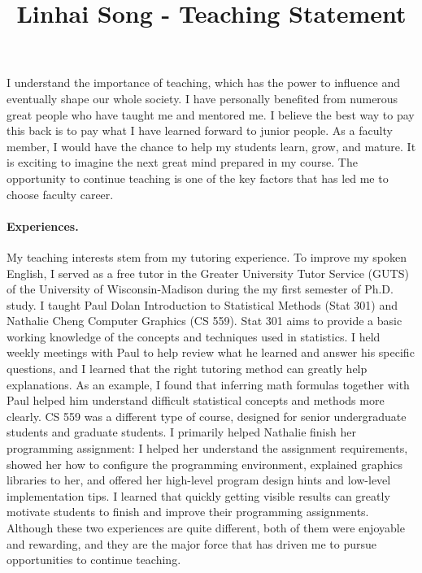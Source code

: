 \documentclass[10pt]{article}
\title{\vspace{-.7in}\bf{Linhai Song - Teaching Statement\vspace{-.4in}}}
\date{}
\begin{document}
\maketitle\vspace{-.2in}

I understand the importance of teaching, which has the power to influence and eventually shape our whole society. 
I have personally benefited from numerous great people who have taught me and mentored me. 
I believe the best way to pay this back is to pay what I have learned forward to junior people. 
As a faculty member, I would have the chance to help my students learn, grow, and mature. 
It is exciting to imagine the next great mind prepared in my course. 
The opportunity to continue teaching is one of the key factors that has led me to choose faculty career.

\vspace{-0.1in}
\paragraph*{Experiences.} 
My teaching interests stem from my tutoring experience. 
To improve my spoken English, I served as a
free tutor in the Greater University Tutor Service (GUTS) of the University of Wisconsin-Madison during the my first semester of Ph.D. study. 
I taught Paul Dolan Introduction to Statistical Methods (Stat 301) and Nathalie Cheng
Computer Graphics (CS 559). 
Stat 301 aims to provide a basic working knowledge of the concepts and techniques
used in statistics. 
I held weekly meetings with Paul to help review what he learned and answer his specific questions, and I learned that the right tutoring method can greatly help explanations. 
As an example, I found that inferring math formulas together with Paul helped him understand difficult statistical concepts and methods more clearly. 
CS 559 was a different type of course, designed for senior undergraduate students and graduate students. 
I primarily helped Nathalie finish her programming assignment: I helped her understand the assignment requirements, 
showed her how to configure the programming environment, 
explained graphics libraries to her, 
and offered her high-level program design hints and low-level implementation tips. 
I learned that quickly getting visible results can greatly motivate students to finish and improve their programming assignments. 
Although these two experiences are quite
different, both of them were enjoyable and rewarding, and they are the major force that has driven me to pursue opportunities to continue teaching.
\end{document}
